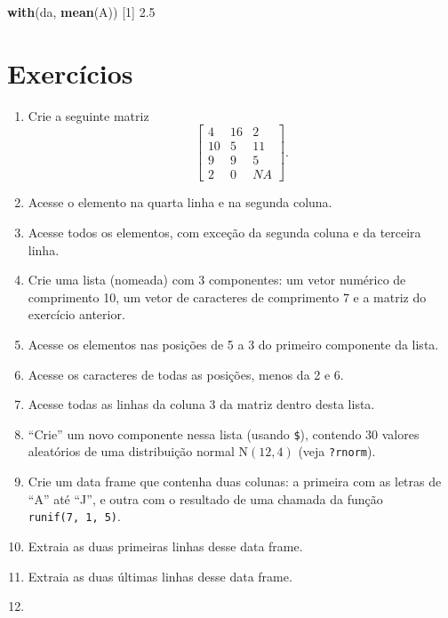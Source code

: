 \documentclass[10pt,a4paper]{book}
\newenvironment{Shaded}{\begin{snugshade}}{\end{snugshade}}
\newcommand{\KeywordTok}[1]{\textcolor[rgb]{0.13,0.29,0.53}{\textbf{#1}}}
\newcommand{\DecValTok}[1]{\textcolor[rgb]{0.00,0.00,0.81}{#1}}
\newcommand{\FloatTok}[1]{\textcolor[rgb]{0.00,0.00,0.81}{#1}}
\newcommand{\NormalTok}[1]{#1}
\providecommand{\tightlist}{%
  \setlength{\itemsep}{0pt}\setlength{\parskip}{0pt}}
\begin{document}
\begin{Shaded}
\begin{Highlighting}[]
\KeywordTok{with}\NormalTok{(da, }\KeywordTok{mean}\NormalTok{(A))}
\NormalTok{[}\DecValTok{1}\NormalTok{] }\FloatTok{2.5}
\end{Highlighting}
\end{Shaded}

\section*{Exercícios}\label{exercuxedcios-6}


\begin{enumerate}
\def\labelenumi{\arabic{enumi}.}
\tightlist
\item
  Crie a seguinte matriz \[\left[ \begin{array}{ccc}
          4 & 16 & 2 \\
          10 & 5 & 11 \\
          9 & 9 & 5 \\
          2 & 0 & NA
          \end{array} \right].\]
\item
  Acesse o elemento na quarta linha e na segunda coluna.
\item
  Acesse todos os elementos, com exceção da segunda coluna e da terceira
  linha.
\item
  Crie uma lista (nomeada) com 3 componentes: um vetor numérico de
  comprimento 10, um vetor de caracteres de comprimento 7 e a matriz do
  exercício anterior.
\item
  Acesse os elementos nas posições de 5 a 3 do primeiro componente da
  lista.
\item
  Acesse os caracteres de todas as posições, menos da 2 e 6.
\item
  Acesse todas as linhas da coluna 3 da matriz dentro desta lista.
\item
  ``Crie'' um novo componente nessa lista (usando \texttt{\$}), contendo
  30 valores aleatórios de uma distribuição normal \(\text{N}(12, 4)\)
  (veja \texttt{?rnorm}).
\item
  Crie um data frame que contenha duas colunas: a primeira com as letras
  de ``A'' até ``J'', e outra com o resultado de uma chamada da função
  \texttt{runif(7,\ 1,\ 5)}.
\item
  Extraia as duas primeiras linhas desse data frame.
\item
  Extraia as duas últimas linhas desse data frame.
\item

\end{enumerate}
\end{document}
